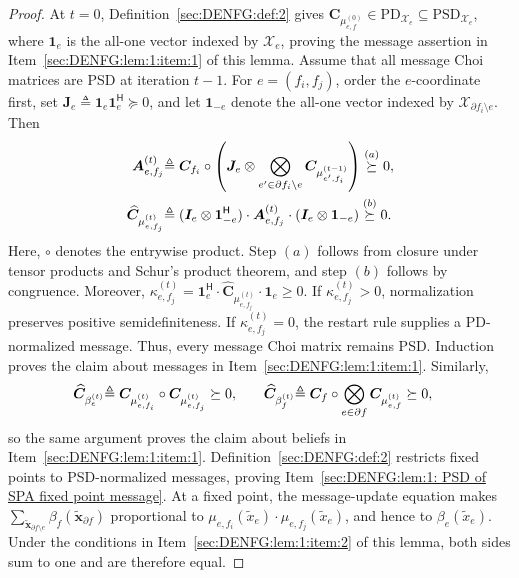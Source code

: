 \documentclass[journal]{IEEEtran}
\newcommand{\add}[1]{{\color{black}#1}}
\newcommand{\vect}[1]{ \bm{#1} }
\newcommand{\set}[1]{\mathcal{#1}}
\newcommand{\beli}{\beta}
\newcommand{\setpf}{ \partial f }
\newcommand{\Herm}{\mathsf{H}}
\newcommand{\defeq}{ \triangleq }
\newcommand{\setPSD}[1]{ \mathrm{PSD}_{#1} }
\newcommand{\setPD}[1]{ \mathrm{PD}_{#1} }
\newcommand{\matr}[1]{\vect{#1}}
\newcommand{\ef}{ e,f }
\newcommand{\setpfi}{ \partial f_{i} }
\newcommand{\txe}{ \tilde{x}_{e} }
\newcommand{\tvx}{ \tilde{\vect{x}}  }
\begin{document}
\begin{proof}
  \add{At $t=0$, Definition~\ref{sec:DENFG:def:2} gives
    $\matr{C}_{\mu_{\ef}^{(0)}}\in\setPD{\set{X}_e}
      \subseteq\setPSD{\set{X}_e}$, where $\bm{1}_e$ is the
    all-one vector indexed by $\set{X}_e$, proving the message assertion in
    Item~\ref{sec:DENFG:lem:1:item:1} of this lemma. Assume that all message
    Choi matrices are PSD at iteration $t-1$.  For $e=(f_i,f_j)$, order the
    $e$-coordinate first, set
    $\matr{J}_e\defeq\bm{1}_e\bm{1}_e^{\Herm}\succeq0$, and let $\bm{1}_{-e}$
    denote the all-one vector indexed by $\set{X}_{\setpfi\setminus e}$. Then}
  \begin{align*}
    \add{\matr{A}_{e,f_j}^{(t)}}
     & \add{\defeq \matr{C}_{f_i}\circ
         \left(\matr{J}_e\otimes
         \bigotimes_{e'\in\setpfi\setminus e}
         \matr{C}_{\mu_{e',f_i}^{(t-1)}}\right)
         \overset{(a)}{\succeq}0,} \\
    \add{\widehat{\matr{C}}_{\mu_{e,f_j}^{(t)}}}
     & \add{\defeq
         (\matr{I}_e\otimes\bm{1}_{-e}^{\Herm})
         \cdot \matr{A}_{e,f_j}^{(t)} \cdot
         (\matr{I}_e\otimes\bm{1}_{-e})
         \overset{(b)}{\succeq}0.}
  \end{align*}
  \add{Here, $\circ$ denotes the entrywise product. Step $(a)$ follows from
    closure under tensor products and Schur's product theorem, and step $(b)$
    follows by congruence. Moreover,
    $\kappa_{e,f_j}^{(t)} =\bm{1}_e^{\Herm} \cdot
      \widehat{\matr{C}}_{\mu_{e,f_j}^{(t)}} \cdot \bm{1}_e\geq0$. If $\kappa_{e,f_j}^{(t)}>0$, normalization preserves positive
    semidefiniteness. If $\kappa_{e,f_j}^{(t)}=0$, the restart rule supplies
    a PD-normalized message. Thus, every message Choi matrix remains PSD. Induction proves the claim about messages in
    Item~\ref{sec:DENFG:lem:1:item:1}. Similarly,}
  \begin{align*}
    \add{\widehat{\matr{C}}_{\beli_e^{(t)}}}
     & \add{\defeq
         \matr{C}_{\mu_{e,f_i}^{(t)}}\circ
         \matr{C}_{\mu_{e,f_j}^{(t)}}\succeq0,} \qquad
    \add{\widehat{\matr{C}}_{\beli_f^{(t)}}}
    \add{\defeq
      \matr{C}_f\circ
      \bigotimes_{e\in\setpf}
      \matr{C}_{\mu_{e,f}^{(t)}}\succeq0,}
  \end{align*}
  \add{so the same argument proves the claim about beliefs in
    Item~\ref{sec:DENFG:lem:1:item:1}. Definition~\ref{sec:DENFG:def:2}
    restricts fixed points to PSD-normalized messages, proving
    Item~\ref{sec:DENFG:lem:1: PSD of SPA fixed point message}. At a fixed
    point, the message-update equation makes
    $\sum_{\tvx_{\setpf\setminus e}}\beli_f(\tvx_{\setpf})$ proportional to
    $\mu_{e,f_i}(\txe) \cdot \mu_{e,f_j}(\txe)$, and hence to $\beli_e(\txe)$.
    Under the conditions in Item~\ref{sec:DENFG:lem:1:item:2} of this lemma,
    both sides sum to one and are therefore equal.}
\end{proof}
\end{document}
